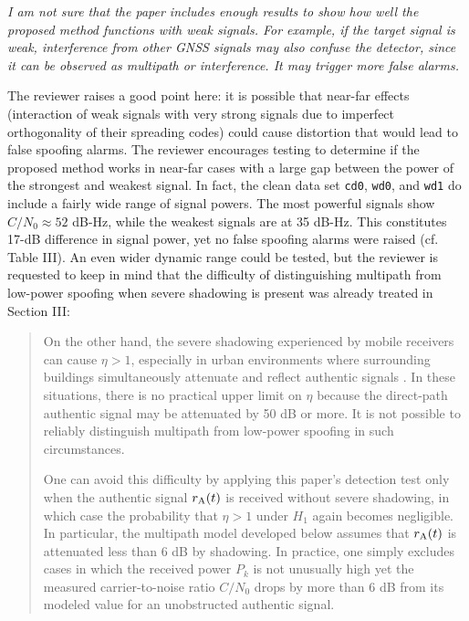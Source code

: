 \documentclass[12pt]{report}
\begin{document}
{\textit{I am not sure that the paper includes enough results to
      show how well the proposed method functions with weak signals. For
      example, if the target signal is weak, interference from other
      GNSS signals may also confuse the detector, since it can be
      observed as multipath or interference. It may trigger more false
      alarms.}}

  
  {{The reviewer raises a good point here: it is possible that near-far
        effects (interaction of weak signals with very strong signals due to
        imperfect orthogonality of their spreading codes) could cause
        distortion that would lead to false spoofing alarms.  The reviewer
        encourages testing to determine if the proposed method works in
        near-far cases with a large gap between the power of the strongest and
        weakest signal.  In fact, the clean data set {\tt cd0}, {\tt wd0}, and
        {\tt wd1} do include a fairly wide range of signal powers.  The most
        powerful signals show $C/N_0 \approx 52$ dB-Hz, while the weakest
        signals are at 35 dB-Hz.  This constitutes 17-dB difference in signal
        power, yet no false spoofing alarms were raised (cf. Table III).  An
        even wider dynamic range could be tested, but the reviewer is
        requested to keep in mind that the difficulty of distinguishing
        multipath from low-power spoofing when severe shadowing is present was
        already treated in Section III:

        \begin{quotation}
          On the other hand, the severe shadowing experienced by mobile
          receivers can cause $\eta > 1$, especially in urban environments
          where surrounding buildings simultaneously attenuate and reflect
          authentic signals \cite{steingass2004measuring}.  In these
          situations, there is no practical upper limit on $\eta$ because the
          direct-path authentic signal may be attenuated by 50 dB or more. It
          is not possible to reliably distinguish multipath from low-power
          spoofing in such circumstances.

          One can avoid this difficulty by applying this paper's detection
          test only when the authentic signal $r_{\rm A}(t)$ is received
          without severe shadowing, in which case the probability that
          $\eta > 1$ under $H_1$ again becomes negligible. In particular, the
          multipath model developed below assumes that $r_{\rm A}(t)$ is
          attenuated less than 6 dB by shadowing.  In practice, one simply
          excludes cases in which the received power $P_k$ is not unusually
          high yet the measured carrier-to-noise ratio $C/N_0$ drops by more
          than 6 dB from its modeled value for an unobstructed authentic
          signal.
        \end{quotation}

}}
\end{document}
